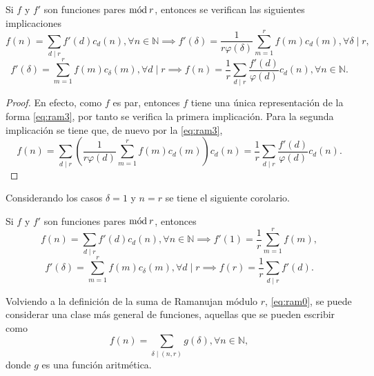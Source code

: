 \begin{corollary}
Si $f$ y $f'$ son funciones pares $\mathrm{m\acute{o}d\:}r$, entonces se verifican las siguientes implicaciones
\begin{equation*}
    f(n) = \sum_{d \mid r} f'(d) c_d(n), \forall n \in \mathbb{N} \implies f'(\delta) = \frac{1}{r \varphi(\delta)} \sum_{m=1}^{r} f(m) c_d(m), \forall \delta \mid r,
\end{equation*}
\begin{equation*}
    f'(\delta) = \sum_{m=1}^{r} f(m) c_{\delta} (m), \forall d \mid r \implies f(n) = \frac{1}{r} \sum_{d \mid r} \frac{f'(d)}{\varphi(d)} c_d(n), \forall n \in \mathbb{N}.
\end{equation*}
\end{corollary}
\begin{proof}
En efecto, como $f$ es par, entonces $f$ tiene una única representación de la forma \eqref{eq:ram3}, por tanto se verifica la primera implicación. Para la segunda implicación se tiene que, de nuevo por la \cref{eq:ram3},
\begin{equation*}
    f(n) = \sum_{d \mid r} \left( \frac{1}{r \varphi(d)} \sum_{m=1}^{r} f(m) c_d(m) \right) c_d(n) = \frac{1}{r} \sum_{d \mid r} \frac{f'(d)}{\varphi(d)} c_d(n).
\end{equation*}
\end{proof}

Considerando los casos $\delta=1$ y $n=r$ se tiene el siguiente corolario.

\begin{corollary}
Si $f$ y $f'$ son funciones pares $\mathrm{m\acute{o}d\:}r$, entonces
\begin{equation*}
    f(n) = \sum_{d \mid r} f'(d) c_d(n), \forall n \in \mathbb{N} \implies f'(1) = \frac{1}{r} \sum_{m=1}^{r} f(m),
\end{equation*}
\begin{equation*}
    f'(\delta) = \sum_{m=1}^{r} f(m) c_{\delta}(m), \forall d \mid r \implies f(r) = \frac{1}{r} \sum_{d \mid r} f'(d).
\end{equation*}
\end{corollary}

Volviendo a la definición de la suma de Ramanujan módulo $r$, \cref{eq:ram0}, se puede considerar una clase más general de funciones, aquellas que se pueden escribir como
\begin{equation*}
    f(n) = \sum_{\delta \mid (n,r)} g(\delta), \forall n \in \mathbb{N},
\end{equation*}
donde $g$ es una función aritmética.
\bigskip

